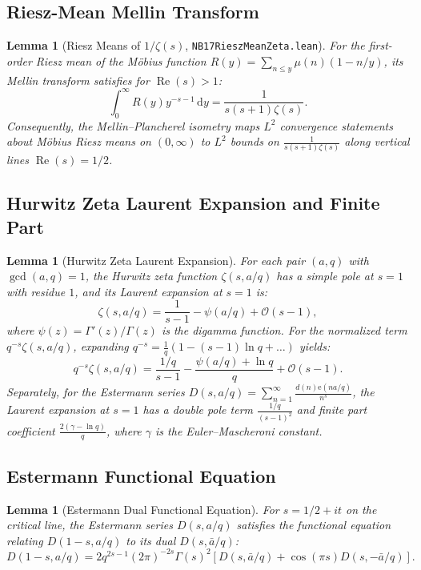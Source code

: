 \documentclass[11pt,a4paper]{article}
\theoremstyle{plain}
\newtheorem{lemma}[theorem]{Lemma}
\theoremstyle{definition}
\theoremstyle{remark}
\newcommand{\e}{\mathrm{e}}
\newcommand{\diff}{\mathrm{d}}
\DeclareMathOperator{\RePart}{Re}
\renewcommand{\Re}{\RePart}
\begin{document}
\subsection{Riesz-Mean Mellin Transform}

\begin{lemma}[Riesz Means of $1/\zeta(s)$, \texttt{NB17RieszMeanZeta.lean}]
For the first-order Riesz mean of the M\"obius function $R(y) = \sum_{n \le y} \mu(n)(1 - n/y)$, its Mellin transform satisfies for $\Re(s) > 1$:
\[
\int_{0}^{\infty} R(y) y^{-s-1} \,\diff y = \frac{1}{s(s+1)\zeta(s)}.
\]
Consequently, the Mellin--Plancherel isometry maps $L^2$ convergence statements about M\"obius Riesz means on $(0,\infty)$ to $L^2$ bounds on $\frac{1}{s(s+1)\zeta(s)}$ along vertical lines $\Re(s) = 1/2$.
\end{lemma}

\subsection{Hurwitz Zeta Laurent Expansion and Finite Part}

\begin{lemma}[Hurwitz Zeta Laurent Expansion]
For each pair $(a, q)$ with $\gcd(a, q) = 1$, the Hurwitz zeta function $\zeta(s, a/q)$ has a simple pole at $s=1$ with residue $1$, and its Laurent expansion at $s=1$ is:
\[
\zeta(s, a/q) = \frac{1}{s-1} - \psi(a/q) + \mathcal{O}(s-1),
\]
where $\psi(z) = \Gamma'(z)/\Gamma(z)$ is the digamma function. For the normalized term $q^{-s}\zeta(s, a/q)$, expanding $q^{-s} = \frac{1}{q}(1 - (s-1)\ln q + \dots)$ yields:
\[
q^{-s}\zeta(s, a/q) = \frac{1/q}{s-1} - \frac{\psi(a/q) + \ln q}{q} + \mathcal{O}(s-1).
\]
Separately, for the Estermann series $D(s, a/q) = \sum_{n=1}^\infty \frac{d(n) \e(na/q)}{n^s}$, the Laurent expansion at $s=1$ has a double pole term $\frac{1/q}{(s-1)^2}$ and finite part coefficient $\frac{2(\gamma - \ln q)}{q}$, where $\gamma$ is the Euler--Mascheroni constant.
\end{lemma}

\subsection{Estermann Functional Equation}

\begin{lemma}[Estermann Dual Functional Equation]
For $s = 1/2 + it$ on the critical line, the Estermann series $D(s, a/q)$ satisfies the functional equation \cite{Estermann1928} relating $D(1-s, a/q)$ to its dual $D(s, \bar{a}/q)$:
\[
D(1-s, a/q) = 2q^{2s-1}(2\pi)^{-2s}\Gamma(s)^2 \left[ D(s, \bar{a}/q) + \cos(\pi s) D(s, -\bar{a}/q) \right].
\]
\end{lemma}
\end{document}
